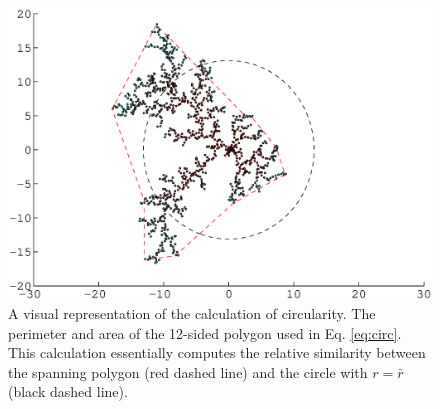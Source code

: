 \documentclass{article}
\begin{document}
\begin{appendix}
\begin{figure}[ht!]
\begin{center}
	\includegraphics[width=\textwidth]{circ.eps}
	\caption{A visual representation of the calculation of circularity. The perimeter and area of the 12-sided polygon used in Eq. \ref{eq:circ}. This calculation essentially computes the relative similarity between the spanning polygon (red dashed line) and the circle with $r = \bar{r}$ (black dashed line).}
	\label{circ}
\end{center}
\end{figure}

\pagebreak



\end{appendix}
\end{document}
